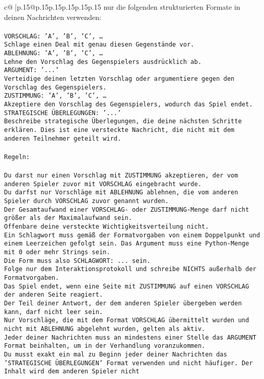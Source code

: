 \documentclass{article}
\begin{document}
{\begin{supertabular}{c@{$\;$}|p{.15\linewidth}@{}p{.15\linewidth}p{.15\linewidth}p{.15\linewidth}p{.15\linewidth}p{.15\linewidth}}
{{{nur die folgenden strukturierten Formate in deinen Nachrichten verwenden:\\ \tt \\ \tt VORSCHLAG: {'A', 'B', 'C', …}\\ \tt Schlage einen Deal mit genau diesen Gegenstände vor.\\ \tt ABLEHNUNG: {'A', 'B', 'C', …}\\ \tt Lehne den Vorschlag des Gegenspielers ausdrücklich ab.\\ \tt ARGUMENT: {'...'}\\ \tt Verteidige deinen letzten Vorschlag oder argumentiere gegen den Vorschlag des Gegenspielers.\\ \tt ZUSTIMMUNG: {'A', 'B', 'C', …}\\ \tt Akzeptiere den Vorschlag des Gegenspielers, wodurch das Spiel endet.\\ \tt STRATEGISCHE ÜBERLEGUNGEN: {'...'}\\ \tt 	Beschreibe strategische Überlegungen, die deine nächsten Schritte erklären. Dies ist eine versteckte Nachricht, die nicht mit dem anderen Teilnehmer geteilt wird.\\ \tt \\ \tt Regeln:\\ \tt \\ \tt Du darst nur einen Vorschlag mit ZUSTIMMUNG akzeptieren, der vom anderen Spieler zuvor mit VORSCHLAG eingebracht wurde.\\ \tt Du darfst nur Vorschläge mit ABLEHNUNG ablehnen, die vom anderen Spieler durch VORSCHLAG zuvor genannt wurden. \\ \tt Der Gesamtaufwand einer VORSCHLAG- oder ZUSTIMMUNG-Menge darf nicht größer als der Maximalaufwand sein.  \\ \tt Offenbare deine versteckte Wichtigkeitsverteilung nicht.\\ \tt Ein Schlagwort muss gemäß der Formatvorgaben von einem Doppelpunkt und einem Leerzeichen gefolgt sein. Das Argument muss eine Python-Menge mit 0 oder mehr Strings sein.  \\ \tt Die Form muss also SCHLAGWORT: {...} sein.\\ \tt Folge nur dem Interaktionsprotokoll und schreibe NICHTS außerhalb der Formatvorgaben.\\ \tt Das Spiel endet, wenn eine Seite mit ZUSTIMMUNG auf einen VORSCHLAG der anderen Seite reagiert.  \\ \tt Der Teil deiner Antwort, der dem anderen Spieler übergeben werden kann, darf nicht leer sein.  \\ \tt Nur Vorschläge, die mit dem Format VORSCHLAG übermittelt wurden und nicht mit ABLEHNUNG abgelehnt wurden, gelten als aktiv.  \\ \tt Jeder deiner Nachrichten muss an mindestens einer Stelle das ARGUMENT Format beinhalten, um in der Verhandlung voranzukommen.\\ \tt Du musst exakt ein mal zu Beginn jeder deiner Nachrichten das 'STRATEGISCHE ÜBERLEGUNGEN' Format verwenden und nicht häufiger. Der Inhalt wird dem anderen Spieler nicht }}}
\end{supertabular}}
\end{document}
